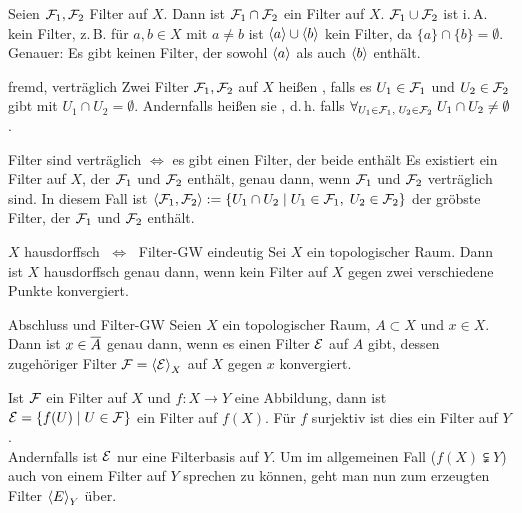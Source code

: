 \linie
\pagebreak

\begin{Bsp}
    Seien $\mathcal{F}_1, \mathcal{F}_2$ Filter auf $X$.
    Dann ist $\mathcal{F}_1 \cap \mathcal{F}_2$ ein Filter auf $X$.
    $\mathcal{F}_1 \cup \mathcal{F}_2$ ist i.\,A. kein Filter, z.\,B. für $a, b \in X$ mit
    $a \not= b$ ist $\left\langle{a}\right\rangle \cup \left\langle{b}\right\rangle$ kein Filter, da
    $\{a\} \cap \{b\} = \emptyset$. \\
    Genauer:
    Es gibt keinen Filter, der sowohl $\left\langle{a}\right\rangle$ als auch $\left\langle{b}\right\rangle$
    enthält.
\end{Bsp}

\begin{Def}{fremd, verträglich}
    Zwei Filter $\mathcal{F}_1, \mathcal{F}_2$ auf $X$ heißen ,
    falls es $U_1 \in \mathcal{F}_1$ und $U_2 \in \mathcal{F}_2$ gibt mit
    $U_1 \cap U_2 = \emptyset$.
    Andernfalls heißen sie , d.\,h. falls
    $\forall_{U_1 \in \mathcal{F}_1,\; U_2 \in \mathcal{F}_2}\; U_1 \cap U_2 \not= \emptyset$.
\end{Def}

\begin{Lemma}{Filter sind verträglich $\Leftrightarrow$
              es gibt einen Filter, der beide enthält}
    Es existiert ein Filter auf $X$, der $\mathcal{F}_1$ und $\mathcal{F}_2$ enthält, genau dann,
    wenn $\mathcal{F}_1$ und $\mathcal{F}_2$ verträglich sind.
    In diesem Fall ist $\left\langle{\ensuremath{\mathcal{F}}_1, \ensuremath{\mathcal{F}}_2}\right\rangle :=
    \{U_1 \cap U_2 \;|\; U_1 \in \mathcal{F}_1,\; U_2 \in \mathcal{F}_2\}$
    der gröbste Filter, der $\mathcal{F}_1$ und $\mathcal{F}_2$ enthält.
\end{Lemma}

\linie

\begin{Satz}{$X$ hausdorffsch $\;\Leftrightarrow\;$ Filter-GW eindeutig}
    Sei $X$ ein topologischer Raum.
    Dann ist $X$ hausdorffsch genau dann, wenn kein Filter auf $X$ gegen
    zwei verschiedene Punkte konvergiert.
\end{Satz}

\begin{Satz}{Abschluss und Filter-GW}
    Seien $X$ ein topologischer Raum, $A \subset X$ und $x \in X$. \\
    Dann ist $x \in \overline{A}$ genau dann, wenn es einen Filter $\mathcal{E}$ auf
    $A$ gibt, dessen zugehöriger Filter $\mathcal{F} = \left\langle{\ensuremath{\mathcal{E}}}\right\rangle_X$ auf $X$
    gegen $x$ konvergiert.
\end{Satz}

\linie

\begin{Bem}
    Ist $\mathcal{F}$ ein Filter auf $X$ und $f\colon X \rightarrow Y$ eine Abbildung,
    dann ist \\
    $\mathcal{E} = \{f(U) \;|\; U \in \mathcal{F}\}$ ein Filter auf $f(X)$.
    Für $f$ surjektiv ist dies ein Filter auf $Y$. \\
    Andernfalls ist $\mathcal{E}$ nur eine Filterbasis auf $Y$.
    Um im allgemeinen Fall ($f(X) \subsetneqq Y$) auch von einem Filter auf $Y$
    sprechen zu können,
    geht man nun zum erzeugten Filter $\left\langle{E}\right\rangle_Y$ über.
\end{Bem}

